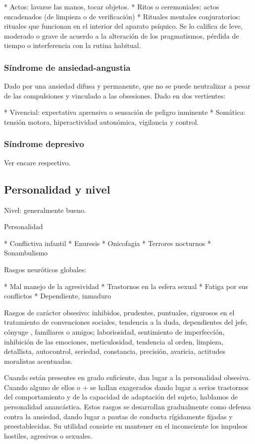 * Actos: lavarse las manos, tocar objetos.
* Ritos o ceremoniales: actos encadenados (de limpieza o de verificación)
* Rituales mentales conjuratorios: rituales que funcionan en el interior del aparato psíquico. Se lo califica de leve, moderado o grave de acuerdo a la alteración de los pragmatismos, pérdida de tiempo o interferencia con la rutina habitual.

\subsubsection{Síndrome de ansiedad-angustia}

Dado por una ansiedad difusa y permanente, que no se puede neutralizar a pesar de las compulsiones y vinculado a las obsesiones. Dado en dos vertientes:

* Vivencial: expectativa aprensiva o sensación de peligro inminente
* Somática: tensión motora, hiperactividad autonómica, vigilancia y control.

\subsubsection{Síndrome depresivo}

Ver encare respectivo.

\subsection*{Personalidad y nivel}

Nivel: generalmente bueno.

Personalidad

* Conflictiva infantil
* Enuresis
* Onicofagia
* Terrores nocturnos
* Sonambulismo

Rasgos neuróticos globales:

* Mal manejo de la agresividad
* Trastornos en la esfera sexual
* Fatiga por sus conflictos
* Dependiente, inmaduro

Rasgos de carácter obsesivo: inhibidos, prudentes, puntuales, rigurosos en el tratamiento de convenciones sociales, tendencia a la duda, dependientes del jefe, cónyuge , familiares o amigos; laboriosidad, sentimiento de imperfección, inhibición de las emociones, meticulosidad, tendencia al orden, limpieza, detallista, autocontrol, seriedad, constancia, precisión, avaricia, actitudes moralistas acentuadas.

Cuando están presentes en grado suficiente, dan lugar a la personalidad obsesiva. Cuando alguno de ellos o + se hallan exagerados dando lugar a serios trastornos del comportamiento y de la capacidad de adaptación del sujeto, hablamos de personalidad anancástica. Estos rasgos se desarrollan gradualmente como defensa contra la ansiedad, dando lugar a pautas de conducta rígidamente fijadas y preestablecidas. Su utilidad consiste en mantener en el inconsciente los impulsos hostiles, agresivos o sexuales.

